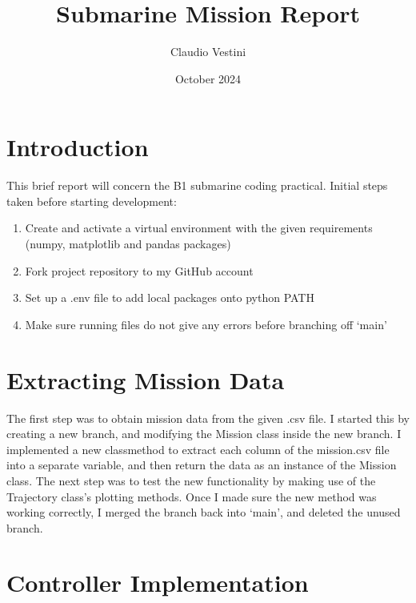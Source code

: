 \documentclass[hidelinks]{article}
\title{Submarine Mission Report}
\author{Claudio Vestini}
\date{October 2024}
\begin{document}
\maketitle
%
\section{Introduction}
This brief report will concern the B1 submarine coding practical.
Initial steps taken before starting development:
\begin{enumerate}
    \item Create and activate a virtual environment with the given requirements (numpy, matplotlib and pandas packages)
    \item Fork project repository to my GitHub account
    \item Set up a .env file to add local packages onto python PATH
    \item Make sure running files do not give any errors before branching off `main'
\end{enumerate}
%
\section{Extracting Mission Data}
The first step was to obtain mission data from the given .csv file.
\newline
I started this by creating a new branch, and modifying the Mission class inside the new branch. I implemented a new classmethod to extract each column of the mission.csv file into a separate variable, and then return the data as an instance of the Mission class.
\newline
The next step was to test the new functionality by making use of the Trajectory class's plotting methods. Once I made sure the new method was working correctly, I merged the branch back into `main', and deleted the unused branch.
%
\section{Controller Implementation}
%
\end{document}
